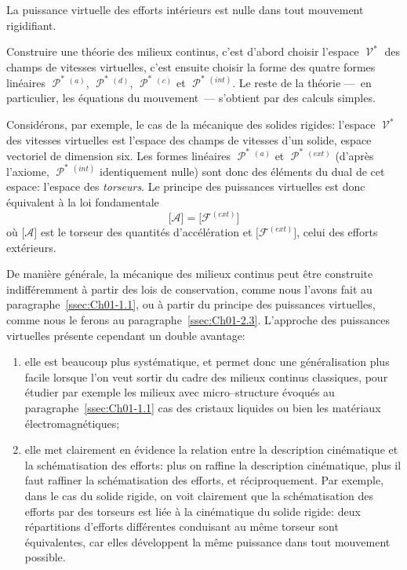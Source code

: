 \begin{Axiome}[Axiome]
    La puissance virtuelle des efforts intérieurs est nulle dans tout mouvement rigidifiant.
\end{Axiome}

Construire une théorie des milieux continus, c'est d'abord choisir l'espace $\mathop{\mathcal{V}}^{\ast}$ des champs de vitesses virtuelles, c'est ensuite choisir la forme des quatre formes linéaires $\mathop{\mathcal{P}}^{\ast}{\!}^{(a)}$, $\mathop{\mathcal{P}}^{\ast}{\!}^{(d)}$, $\mathop{\mathcal{P}}^{\ast}{\!}^{(c)}$ et $\mathop{\mathcal{P}}^{\ast}{\!}^{(int)}$.
Le reste de la théorie ---~en particulier, les équations du mouvement~--- s'obtient par des calculs simples.

Considérons, par exemple, le cas de la mécanique des solides rigides: l'espace $\mathop{\mathcal{V}}^{\ast}$ des vitesses virtuelles est l'espace des champs de vitesses d'un solide, espace vectoriel de dimension six.
Les formes linéaires $\mathop{\mathcal{P}}^{\ast}{\!}^{(a)}$ et $\mathop{\mathcal{P}}^{\ast}{\!}^{(ext)}$ (d'après l'axiome, $\mathop{\mathcal{P}}^{\ast}{\!}^{(int)}$ identiquement nulle) sont donc des éléments du dual de cet espace: l'espace des \emph{torseurs}.
Le principe des puissances virtuelles est donc équivalent à la loi fondamentale
\begin{equation}
    \bigl[ \mathcal{A} \bigr] = \bigl[ \mathcal{F}^{(ext)} \bigr]
    \label{eq:Ch01-032}
\end{equation}
où $\bigl[ \mathcal{A} \bigr]$ est le torseur des quantités d'accélération et $\bigl[ \mathcal{F}^{(ext)} \bigr]$, celui des efforts extérieurs.

De manière générale, la mécanique des milieux continus peut être construite indifféremment à partir des lois de conservation, comme nous l'avons fait au paragraphe~\ref{ssec:Ch01-1.1}, ou à partir du principe des puissances virtuelles, comme nous le ferons au paragraphe~\ref{ssec:Ch01-2.3}.
L'approche des puissances virtuelles présente cependant un double avantage:
\begin{enumerate}
    \item elle est beaucoup plus systématique, et permet donc une généralisation plus facile lorsque l'on veut sortir du cadre des milieux continus classiques, pour étudier par exemple les milieux avec micro--structure évoqués au paragraphe~\ref{ssec:Ch01-1.1} cas des cristaux liquides ou bien les matériaux électromagnétiques;
    \item elle met clairement en évidence la relation entre la description cinématique et la schématisation des efforts: plus on raffine la description cinématique, plus il faut raffiner la schématisation des efforts, et réciproquement.
        Par exemple, dans le cas du solide rigide, on voit clairement que la schématisation des efforts par des torseurs est liée à la cinématique du solide rigide: deux répartitions d'efforts différentes conduisant au même torseur sont équivalentes, car elles développent la même puissance dans tout mouvement possible.
\end{enumerate}

